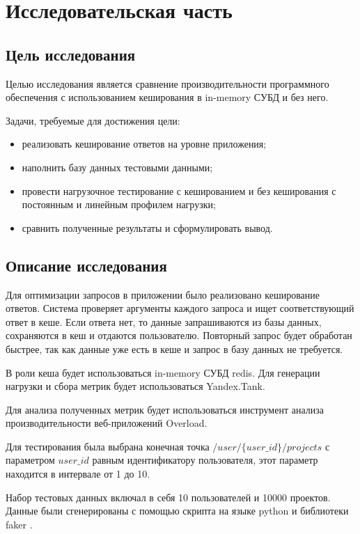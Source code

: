 \section{Исследовательская часть}

\subsection{Цель исследования}

Целью исследования является сравнение производительности программного обеспечения с использованием кеширования в in-memory СУБД и без него.

Задачи, требуемые для достижения цели:

\begin{itemize}[leftmargin=1.6\parindent]
	\item реализовать кеширование ответов на уровне приложения;
	\item наполнить базу данных тестовыми данными;
	\item провести нагрузочное тестирование с кешированием и без кеширования с постоянным и линейным профилем нагрузки;
	\item сравнить полученные результаты и сформулировать вывод.
\end{itemize}

\subsection{Описание исследования}
Для оптимизации запросов в приложении было реализовано кеширование ответов. Система проверяет аргументы каждого запроса и ищет соответствующий ответ в кеше. Если ответа нет, то данные запрашиваются из базы данных, сохраняются в кеш и отдаются пользователю. Повторный запрос будет обработан быстрее, так как данные уже есть в кеше и запрос в базу данных не требуется. 

В роли кеша будет использоваться in-memory СУБД redis. Для генерации нагрузки и сбора метрик будет использоваться Yandex.Tank\cite{yandex-tank}.

Для анализа полученных метрик  будет использоваться  инструмент анализа производительности веб-приложений Overload\cite{overload}.

Для тестирования была выбрана конечная точка  $/user/\{user\_id\}/projects$ с параметром $user\_id$ равным идентификатору пользователя, этот параметр находится в интервале от 1 до 10.  

Набор тестовых данных включал в себя 10 пользователей и 10000 проектов. Данные были сгенерированы с помощью скрипта на языке python \cite{python} и библиотеки faker \cite{faker}.

